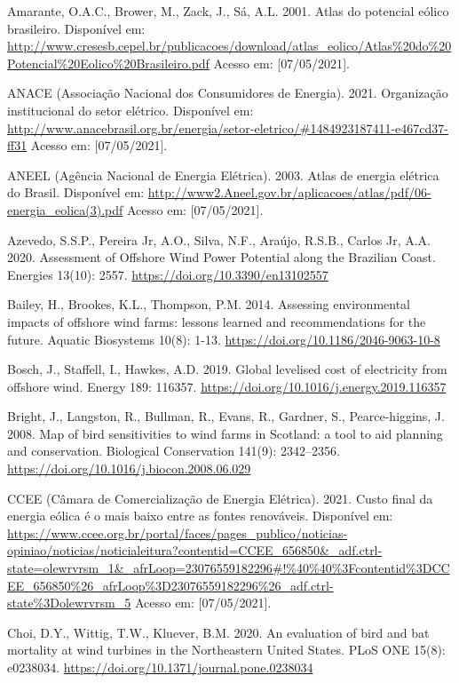 \documentclass[
  oneside]{scrbook}
\begin{document}
Amarante, O.A.C., Brower, M., Zack, J., Sá, A.L. 2001. Atlas do potencial eólico brasileiro. Disponível em: \url{http://www.cresesb.cepel.br/publicacoes/download/atlas_eolico/Atlas\%20do\%20Potencial\%20Eolico\%20Brasileiro.pdf} Acesso em: {[}07/05/2021{]}.

ANACE (Associação Nacional dos Consumidores de Energia). 2021. Organização institucional do setor elétrico. Disponível em: \url{http://www.anacebrasil.org.br/energia/setor-eletrico/\#1484923187411-e467cd37-ff31} Acesso em: {[}07/05/2021{]}.

ANEEL (Agência Nacional de Energia Elétrica). 2003. Atlas de energia elétrica do Brasil. Disponível em: \url{http://www2.Aneel.gov.br/aplicacoes/atlas/pdf/06-energia_eolica(3).pdf} Acesso em: {[}07/05/2021{]}.

Azevedo, S.S.P., Pereira Jr, A.O., Silva, N.F., Araújo, R.S.B., Carlos Jr, A.A. 2020. Assessment of Offshore Wind Power Potential along the Brazilian Coast. Energies 13(10): 2557. \url{https://doi.org/10.3390/en13102557}

Bailey, H., Brookes, K.L., Thompson, P.M. 2014. Assessing environmental impacts of offshore wind farms: lessons learned and recommendations for the future. Aquatic Biosystems 10(8): 1-13. \url{https://doi.org/10.1186/2046-9063-10-8}

Bosch, J., Staffell, I., Hawkes, A.D. 2019. Global levelised cost of electricity from offshore wind. Energy 189: 116357. \url{https://doi.org/10.1016/j.energy.2019.116357}

Bright, J., Langston, R., Bullman, R., Evans, R., Gardner, S., Pearce-higgins, J. 2008. Map of bird sensitivities to wind farms in Scotland: a tool to aid planning and conservation. Biological Conservation 141(9): 2342--2356. \url{https://doi.org/10.1016/j.biocon.2008.06.029}

CCEE (Câmara de Comercialização de Energia Elétrica). 2021. Custo final da energia eólica é o mais baixo entre as fontes renováveis. Disponível em: \url{https://www.ccee.org.br/portal/faces/pages_publico/noticias-opiniao/noticias/noticialeitura?contentid=CCEE_656850\&_adf.ctrl-state=olewrvrsm_1\&_afrLoop=23076559182296\#!\%40\%40\%3Fcontentid\%3DCCEE_656850\%26_afrLoop\%3D23076559182296\%26_adf.ctrl-state\%3Dolewrvrsm_5} Acesso em: {[}07/05/2021{]}.

Choi, D.Y., Wittig, T.W., Kluever, B.M. 2020. An evaluation of bird and bat mortality at wind turbines in the Northeastern United States. PLoS ONE 15(8): e0238034. \url{https://doi.org/10.1371/journal.pone.0238034}
\end{document}
